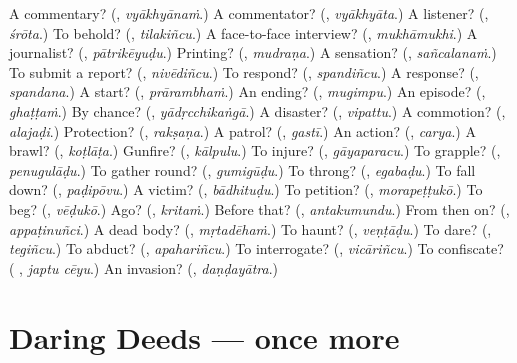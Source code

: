 \begin{tcolorbox}[breakable,colback=teal!4,colframe=teal!35!black,title={Before you move on}]
A commentary? (\textbf{}, \emph{vyākhyānaṁ}.) A commentator? (\textbf{}, \emph{vyākhyāta}.) A listener? (\textbf{}, \emph{śrōta}.) To behold? (\textbf{}, \emph{tilakiñcu}.) A face-to-face interview? (\textbf{}, \emph{mukhāmukhi}.) A journalist? (\textbf{}, \emph{pātrikēyuḍu}.) Printing? (\textbf{}, \emph{mudraṇa}.) A sensation? (\textbf{}, \emph{sañcalanaṁ}.) To submit a report? (\textbf{}, \emph{nivēdiñcu}.) To respond? (\textbf{}, \emph{spandiñcu}.) A response? (\textbf{}, \emph{spandana}.) A start? (\textbf{}, \emph{prārambhaṁ}.) An ending? (\textbf{}, \emph{mugimpu}.) An episode? (\textbf{}, \emph{ghaṭṭaṁ}.) By chance? (\textbf{}, \emph{yādṛcchikaṅgā}.) A disaster? (\textbf{}, \emph{vipattu}.) A commotion? (\textbf{}, \emph{alajaḍi}.) Protection? (\textbf{}, \emph{rakṣaṇa}.) A patrol? (\textbf{}, \emph{gastī}.) An action? (\textbf{}, \emph{carya}.) A brawl? (\textbf{}, \emph{koṭlāṭa}.) Gunfire? (\textbf{}, \emph{kālpulu}.) To injure? (\textbf{}, \emph{gāyaparacu}.) To grapple? (\textbf{}, \emph{penugulāḍu}.) To gather round? (\textbf{}, \emph{gumigūḍu}.) To throng? (\textbf{}, \emph{egabaḍu}.) To fall down? (\textbf{}, \emph{paḍipōvu}.) A victim? (\textbf{}, \emph{bādhituḍu}.) To petition? (\textbf{}, \emph{morapeṭṭukō}.) To beg? (\textbf{}, \emph{vēḍukō}.) Ago? (\textbf{}, \emph{kritaṁ}.) Before that? (\textbf{}, \emph{antakumundu}.) From then on? (\textbf{}, \emph{appaṭinuñci}.) A dead body? (\textbf{}, \emph{mṛtadēhaṁ}.) To haunt? (\textbf{}, \emph{veṇṭāḍu}.) To dare? (\textbf{}, \emph{tegiñcu}.) To abduct? (\textbf{}, \emph{apahariñcu}.) To interrogate? (\textbf{}, \emph{vicāriñcu}.) To confiscate? (\textbf{ }, \emph{japtu cēyu}.) An invasion? (\textbf{}, \emph{daṇḍayātra}.)
\end{tcolorbox}
\section[(dialogue)]{Daring Deeds — once more}

